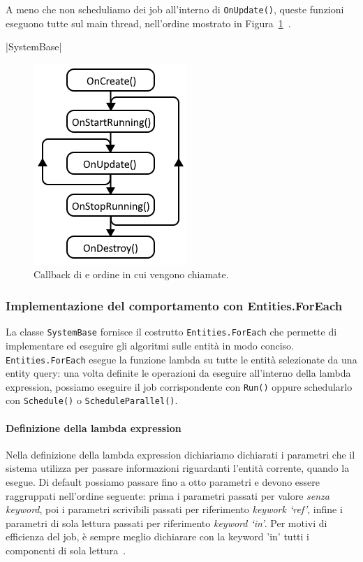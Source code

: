 A meno che non scheduliamo dei job all'interno di \verb|OnUpdate()|, queste funzioni eseguono tutte sul main thread, nell'ordine mostrato in Figura~\ref{fig:system-callbacks}~\cite{doc:unity-entities-api}.

|SystemBase|

\begin{figure}[!ht]
    \centering
    \includegraphics[width=0.34\columnwidth]{gfx/imgs/chapter2/SystemEventCallbacks.png}
    \caption{Callback di  e ordine in cui vengono chiamate.}
    \label{fig:system-callbacks}
\end{figure}

\subsubsection{Implementazione del comportamento con Entities.ForEach}
\label{subsubsec:impl-sistema}
La classe \verb|SystemBase| fornisce il costrutto \verb|Entities.ForEach| che permette di implementare ed eseguire gli algoritmi sulle entità in modo conciso. \verb|Entities.ForEach| esegue la funzione lambda su tutte le entità selezionate da una entity query: una volta definite le operazioni da eseguire all'interno della lambda expression, possiamo eseguire il job corrispondente con \verb|Run()| oppure schedularlo con \verb|Schedule()| o \verb|ScheduleParallel()|. 

\paragraph{Definizione della lambda expression}
Nella definizione della lambda expression dichiariamo dichiarati i parametri che il sistema utilizza per passare informazioni riguardanti l'entità corrente, quando la esegue.
Di default possiamo passare fino a otto parametri e devono essere raggruppati nell'ordine seguente: prima i parametri passati per valore \emph{senza keyword}, poi i parametri scrivibili passati per riferimento \emph{keywork `ref'}, infine i parametri di sola lettura passati per riferimento \emph{keyword `in'}. Per motivi di efficienza del job, è sempre meglio dichiarare con la keyword 'in' tutti i componenti di sola lettura~\cite{doc:unity-entities-api}.

